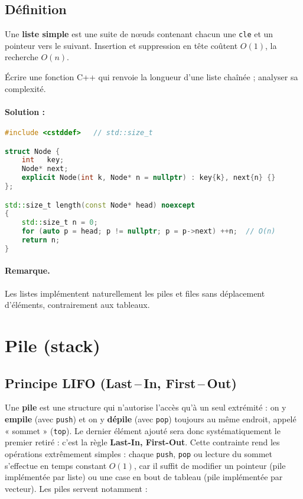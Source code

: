 \subsection{Définition}
Une \textbf{liste simple} est une suite de nœuds contenant chacun une
\lstinline|cle| et un pointeur vers le suivant.
Insertion et suppression en tête coûtent $O(1)$, la recherche $O(n)$.

\begin{exercice}[Parcours]
Écrire une fonction C++ qui renvoie la longueur d’une liste chaînée ;
analyser sa complexité.
\end{exercice}

\paragraph{Solution : }



\begin{lstlisting}[language=C++,caption={list\_length.cpp}]
#include <cstddef>   // std::size_t

struct Node {
    int   key;
    Node* next;
    explicit Node(int k, Node* n = nullptr) : key{k}, next{n} {}
};

std::size_t length(const Node* head) noexcept
{
    std::size_t n = 0;
    for (auto p = head; p != nullptr; p = p->next) ++n;  // O(n)
    return n;
}
\end{lstlisting}


\paragraph{Remarque.}
Les listes implémentent naturellement les piles et files sans déplacement
d’éléments, contrairement aux tableaux.

\section{Pile (stack)}

\subsection{Principe LIFO (Last\,–\,In, First\,–\,Out)}

Une \textbf{pile} est une structure qui n’autorise l’accès qu’à un seul extrémité : on y \textbf{empile} (avec \lstinline|push|) et on y \textbf{dépile}
(avec \lstinline|pop|) toujours au même endroit, appelé « sommet »
(\lstinline|top|).  Le dernier élément ajouté sera donc systématiquement le
premier retiré : c’est la règle \textbf{Last-In, First-Out}.
Cette contrainte rend les opérations extrêmement simples : chaque
\lstinline|push|, \lstinline|pop| ou lecture du sommet s’effectue en temps
constant $O(1)$, car il suffit de modifier un pointeur (pile implémentée par
liste) ou une case en bout de tableau (pile implémentée par vecteur).
Les piles servent notamment :

